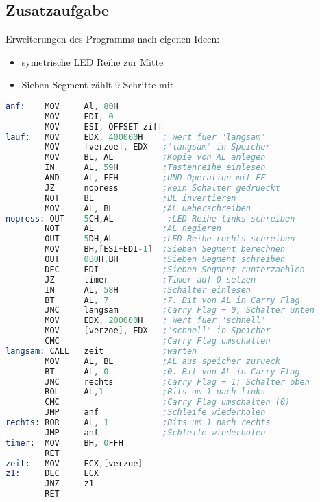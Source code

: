 \documentclass[10pt, a4paper]{report}
\begin{document}
\subsection*{Zusatzaufgabe}
Erweiterungen des Programms nach eigenen Ideen:
\begin{itemize}
    \item symetrische LED Reihe zur Mitte
    \item Sieben Segment zählt 9 Schritte mit 
\end{itemize}
\begin{lstlisting}[language=Assembler]
anf:    MOV     Al, 80H
        MOV     EDI, 0 
        MOV     ESI, OFFSET ziff
lauf:   MOV     EDX, 400000H    ; Wert fuer "langsam"
        MOV     [verzoe], EDX   ;"langsam" in Speicher
        MOV     BL, AL          ;Kopie von AL anlegen
        IN      AL, 59H         ;Tastenreihe einlesen
        AND     AL, FFH         ;UND Operation mit FF
        JZ      nopress         ;kein Schalter gedrueckt
        NOT     BL              ;BL invertieren
        MOV     AL, BL          ;AL ueberschreiben
nopress: OUT    5CH,AL           ;LED Reihe links schreiben
        NOT     AL              ;AL negieren
        OUT     5DH,AL          ;LED Reihe rechts schreiben
        MOV     BH,[ESI+EDI-1]  ;Sieben Segment berechnen
        OUT     0B0H,BH         ;Sieben Segment schreiben
        DEC     EDI             ;Sieben Segment runterzaehlen
        JZ      timer           ;Timer auf 0 setzen
        IN      AL, 58H         ;Schalter einlesen
        BT      AL, 7           ;7. Bit von AL in Carry Flag
        JNC     langsam         ;Carry Flag = 0, Schalter unten
        MOV     EDX, 200000H    ; Wert fuer "schnell"
        MOV     [verzoe], EDX   ;"schnell" in Speicher
        CMC                     ;Carry Flag umschalten
langsam: CALL   zeit            ;warten
        MOV     AL, BL          ;AL aus speicher zurueck
        BT      AL, 0           ;0. Bit von AL in Carry Flag
        JNC     rechts          ;Carry Flag = 1; Schalter oben
        ROL     AL,1            ;Bits um 1 nach links
        CMC                     ;Carry Flag umschalten (0)
        JMP     anf             ;Schleife wiederholen
rechts: ROR     AL, 1           ;Bits um 1 nach rechts
        JMP     anf             ;Schleife wiederholen
timer:  MOV     BH, 0FFH
        RET 
zeit:   MOV     ECX,[verzoe]
z1:     DEC     ECX
        JNZ     z1
        RET
\end{lstlisting}
\end{document}
